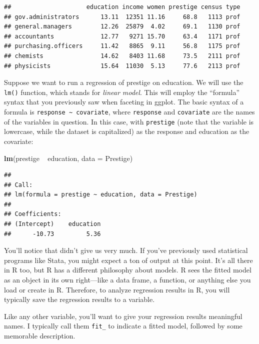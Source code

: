 \documentclass[12pt,oneside,openany]{book}
\newenvironment{Shaded}{\begin{snugshade}}{\end{snugshade}}
\newcommand{\KeywordTok}[1]{\textcolor[rgb]{0.13,0.29,0.53}{\textbf{{#1}}}}
\newcommand{\DataTypeTok}[1]{\textcolor[rgb]{0.13,0.29,0.53}{{#1}}}
\newcommand{\StringTok}[1]{\textcolor[rgb]{0.31,0.60,0.02}{{#1}}}
\newcommand{\NormalTok}[1]{{#1}}
\begin{document}
\begin{verbatim}
##                     education income women prestige census type
## gov.administrators      13.11  12351 11.16     68.8   1113 prof
## general.managers        12.26  25879  4.02     69.1   1130 prof
## accountants             12.77   9271 15.70     63.4   1171 prof
## purchasing.officers     11.42   8865  9.11     56.8   1175 prof
## chemists                14.62   8403 11.68     73.5   2111 prof
## physicists              15.64  11030  5.13     77.6   2113 prof
\end{verbatim}

Suppose we want to run a regression of prestige on education. We will
use the \texttt{lm()} function, which stands for \emph{linear model}.
This will employ the ``formula'' syntax that you previously saw when
faceting in ggplot. The basic syntax of a formula is
\texttt{response\ \textasciitilde{}\ covariate}, where \texttt{response}
and \texttt{covariate} are the names of the variables in question. In
this case, with \texttt{prestige} (note that the variable is lowercase,
while the dataset is capitalized) as the response and education as the
covariate:

\begin{Shaded}
\begin{Highlighting}[]
\KeywordTok{lm}\NormalTok{(prestige ~}\StringTok{ }\NormalTok{education, }\DataTypeTok{data =} \NormalTok{Prestige)}
\end{Highlighting}
\end{Shaded}

\begin{verbatim}
## 
## Call:
## lm(formula = prestige ~ education, data = Prestige)
## 
## Coefficients:
## (Intercept)    education  
##      -10.73         5.36
\end{verbatim}

You'll notice that didn't give us very much. If you've previously used
statistical programs like Stata, you might expect a ton of output at
this point. It's all there in R too, but R has a different philosophy
about models. R sees the fitted model as an object in its own
right---like a data frame, a function, or anything else you load or
create in R. Therefore, to analyze regression results in R, you will
typically save the regression results to a variable.

Like any other variable, you'll want to give your regression results
meaningful names. I typically call them \texttt{fit\_} to indicate a
fitted model, followed by some memorable description.
\end{document}
